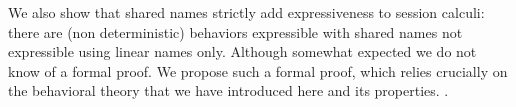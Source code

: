 \smallskip

We also show that shared names strictly add expressiveness to session calculi:
there are (non deterministic) behaviors expressible with shared names not expressible using linear names only.
Although somewhat expected we do not know of a formal proof.
We propose such a formal proof, which relies crucially on the behavioral theory that we have introduced here
and its properties. .


